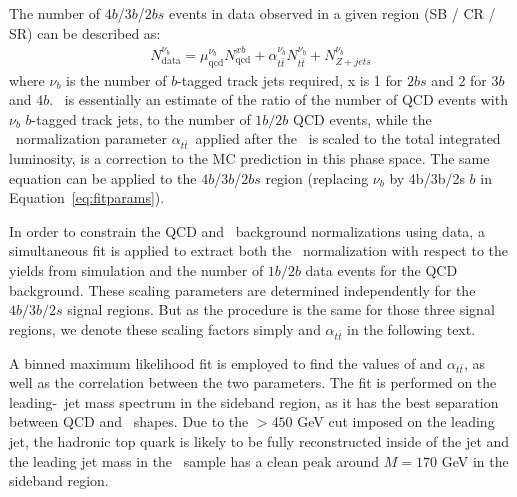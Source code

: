 The number of $4b$/$3b$/$2bs$ events in data observed in a given region (SB / CR / SR) can be described as:
\begin{eqnarray}\label{eq:fitparams}
N^{\nu_b}_{\text{data}} = \mu_{\text{qcd}}^{\nu_b} N^{xb}_{\text{qcd}} + \alpha_{t\bar{t}}^{\nu_b} N^{\nu_b}_{t\bar{t}} + N^{\nu_b}_{Z+jets}
\end{eqnarray}
where $\nu_b$ is the number of $b$-tagged track jets required, x is 1 for $2bs$ and 2 for $3b$ and $4b$. \muqcd\ is essentially an estimate of the ratio of the number of  QCD events with $\nu_b$ $b$-tagged track jets, to the number of $1b/2b$ QCD events, while the \ttbar\ normalization parameter $\alpha_{t\bar{t}}$\, applied after the \ttbar\ is scaled to the total integrated luminosity, is a correction to the MC prediction in this phase space. The same equation can be applied to the $4b$/$3b$/$2bs$ region (replacing $\nu_b$ by 4b/3b/2s $b$ in Equation~\ref{eq:fitparams}).   

In order to constrain the QCD and \ttbar\ background normalizations using data, a simultaneous fit is applied to extract both the \ttbar\ normalization with respect to the yields from simulation and the number of $1b/2b$ data events for the QCD background.  These scaling parameters are determined independently for the $4b/3b/2s$ signal regions. But as the procedure is the same for those three signal regions, we denote these scaling factors simply \muqcd and $\alpha_{t\bar{t}}$ in the following text.

A binned maximum likelihood fit is employed to find the values of \muqcd and $\alpha_{t\bar{t}}$, as well as the correlation between the two parameters. The fit is performed on the leading-\pt\ jet mass spectrum in the sideband region, as it has the best separation between QCD and \ttbar\ shapes. Due to the \pt $>450$ GeV cut imposed on the leading \largeR jet, the hadronic top quark is likely to be fully reconstructed inside of the \largeR jet and the leading jet mass in the \ttbar\ sample has a clean peak around $M=170$ GeV in the sideband region.

